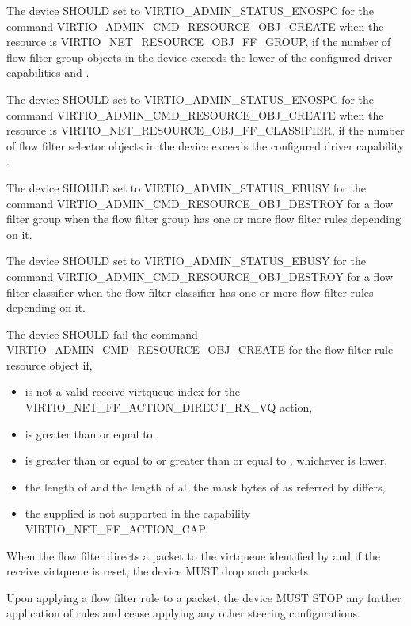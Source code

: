 The device SHOULD set  to VIRTIO_ADMIN_STATUS_ENOSPC for the
command VIRTIO_ADMIN_CMD_RESOURCE_OBJ_CREATE when the resource 
is VIRTIO_NET_RESOURCE_OBJ_FF_GROUP, if the number of flow filter group
objects in the device exceeds the lower of the configured driver
capabilities  and .

The device SHOULD set  to VIRTIO_ADMIN_STATUS_ENOSPC for the
command VIRTIO_ADMIN_CMD_RESOURCE_OBJ_CREATE when the resource  is
VIRTIO_NET_RESOURCE_OBJ_FF_CLASSIFIER, if the number of flow filter selector
objects in the device exceeds the configured driver capability
.

The device SHOULD set  to VIRTIO_ADMIN_STATUS_EBUSY for the
command VIRTIO_ADMIN_CMD_RESOURCE_OBJ_DESTROY for a flow filter group when
the flow filter group has one or more flow filter rules depending on it.

The device SHOULD set  to VIRTIO_ADMIN_STATUS_EBUSY for the
command VIRTIO_ADMIN_CMD_RESOURCE_OBJ_DESTROY for a flow filter classifier when
the flow filter classifier has one or more flow filter rules depending on it.

The device SHOULD fail the command VIRTIO_ADMIN_CMD_RESOURCE_OBJ_CREATE for the
flow filter rule resource object if,
\begin{itemize}
\item {} is not a valid receive virtqueue index for
the VIRTIO_NET_FF_ACTION_DIRECT_RX_VQ action,
\item {} is greater than or equal to
      ,
\item {} is greater than or equal to  or
      greater than or equal to , whichever is lower,
\item the length of  and the length of all the mask bytes of
       as referred by  differs,
\item the supplied  is not supported in the capability VIRTIO_NET_FF_ACTION_CAP.
\end{itemize}

When the flow filter directs a packet to the virtqueue identified by
 and if the receive virtqueue is reset, the device
MUST drop such packets.

Upon applying a flow filter rule to a packet, the device MUST STOP any further
application of rules and cease applying any other steering configurations.

